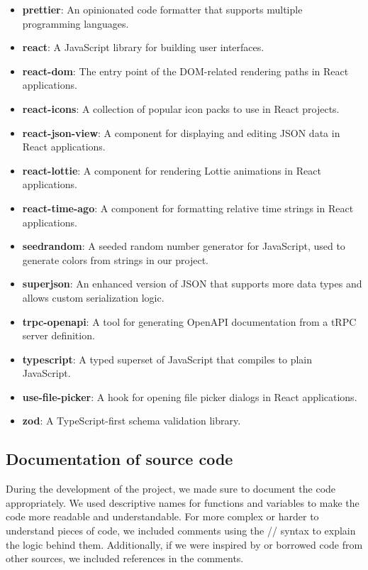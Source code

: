 \begin{itemize}
    \item \textbf{prettier}: An opinionated code formatter that supports multiple programming languages.
    \item \textbf{react}: A JavaScript library for building user interfaces.
    \item \textbf{react-dom}: The entry point of the DOM-related rendering paths in React applications.
    \item \textbf{react-icons}: A collection of popular icon packs to use in React projects.
    \item \textbf{react-json-view}: A component for displaying and editing JSON data in React applications.
    \item \textbf{react-lottie}: A component for rendering Lottie animations in React applications.
    \item \textbf{react-time-ago}: A component for formatting relative time strings in React applications.
    \item \textbf{seedrandom}: A seeded random number generator for JavaScript, used to generate colors from strings in our project.
    \item \textbf{superjson}: An enhanced version of JSON that supports more data types and allows custom serialization logic.
    \item \textbf{trpc-openapi}: A tool for generating OpenAPI documentation from a tRPC server definition.
    \item \textbf{typescript}: A typed superset of JavaScript that compiles to plain JavaScript.
    \item \textbf{use-file-picker}: A hook for opening file picker dialogs in React applications.
    \item \textbf{zod}: A TypeScript-first schema validation library. 
\end{itemize}


\subsection{Documentation of source code}

During the development of the project, we made sure to document the code appropriately. We used descriptive names for functions and variables to make the code more readable and understandable. For more complex or harder to understand pieces of code, we included comments using the // syntax to explain the logic behind them. Additionally, if we were inspired by or borrowed code from other sources, we included references in the comments. 

